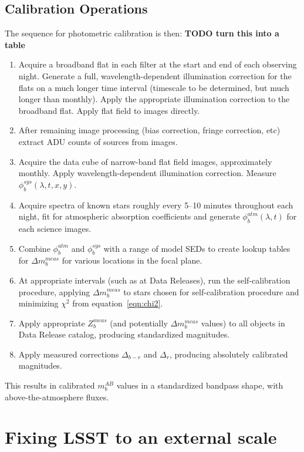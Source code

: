\documentclass[12pt,preprint]{aastex}
\begin{document}
\subsection{Calibration Operations}
The sequence for photometric calibration is then:
{\bf TODO turn this into a table}
\begin{enumerate}
\item{Acquire a broadband flat in each filter at the start and end
of each observing night. Generate a full, wavelength-dependent
illumination correction for the flats on a much longer time interval
(timescale to be determined, but much longer than monthly). Apply
the appropriate illumination correction to the broadband flat. Apply
flat field to images directly.}
\item{After remaining image processing (bias correction, fringe
correction, etc) extract ADU counts of sources from images. }
\item{Acquire the data cube of narrow-band flat field images,
approximately monthly. Apply wavelength-dependent illumination
correction. Measure $\phi_b^{sys}(\lambda,t,x,y)$. }
\item{Acquire spectra of known stars roughly every 5--10 minutes
throughout each night, fit for atmospheric absorption coefficients and
generate $\phi_b^{atm}(\lambda,t)$ for each science images. }
\item{Combine $\phi_b^{atm}$ and $\phi_b^{sys}$ with a range of model
SEDs to create lookup tables for $\Delta m_b^{meas}$ for various
locations in the focal plane. }
\item{At appropriate intervals (such as at Data Releases), run the
self-calibration procedure, applying $\Delta m_b^{meas}$ to stars
chosen for self-calibration procedure and minimizing $\chi^2$ from
equation~\ref{eqn:chi2}.}
\item{Apply appropriate $Z_b^{meas}$ (and potentially $\Delta
m_b^{meas}$ values) to all objects in Data Release catalog, producing
standardized magnitudes.}
\item{Apply measured corrections $\Delta_{b-r}$ and $\Delta_r$,
producing absolutely calibrated magnitudes.}
\end{enumerate}
This results in calibrated $m_b^{AB}$ values in a standardized
bandpass shape, with above-the-atmosphere fluxes.

\section{Fixing LSST to an external scale}
\label{sec:calib_external}
\end{document}
